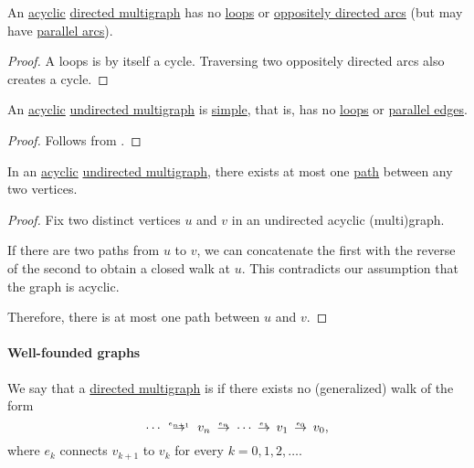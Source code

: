 \begin{proposition}\label{thm:acyclic_directed_multigraph}
  An \hyperref[def:acyclic_graph]{acyclic} \hyperref[def:directed_multigraph]{directed multigraph} has no \hyperref[def:directed_multigraph/loop]{loops} or \hyperref[def:directed_multigraph/parallel]{oppositely directed arcs} (but may have \hyperref[def:directed_multigraph/parallel]{parallel arcs}).
\end{proposition}
\begin{proof}
  A loops is by itself a cycle. Traversing two oppositely directed arcs also creates a cycle.
\end{proof}

\begin{proposition}\label{thm:acyclic_undirected_multigraph}
  An \hyperref[def:acyclic_graph]{acyclic} \hyperref[def:hypergraph/multigraph]{undirected multigraph} is \hyperref[def:undirected_graph]{simple}, that is, has no \hyperref[def:hypergraph/loop]{loops} or \hyperref[def:hypergraph/parallel]{parallel edges}.
\end{proposition}
\begin{proof}
  Follows from .
\end{proof}

\begin{proposition}\label{thm:acyclic_graph_paths}
  In an \hyperref[def:acyclic_graph]{acyclic} \hyperref[def:hypergraph/multigraph]{undirected multigraph}, there exists at most one \hyperref[def:graph_walk/path]{path} between any two vertices.
\end{proposition}
\begin{proof}
  Fix two distinct vertices \( u \) and \( v \) in an undirected acyclic (multi)graph.

  If there are two paths from \( u \) to \( v \), we can concatenate the first with the reverse of the second to obtain a closed walk at \( u \). This contradicts our assumption that the graph is acyclic.

  Therefore, there is at most one path between \( u \) and \( v \).
\end{proof}

\paragraph{Well-founded graphs}

\begin{definition}\label{def:well_founded_graph}\mimprovised
  We say that a \hyperref[def:directed_multigraph]{directed multigraph} is  if there exists no (generalized) walk of the form
  \begin{equation}
    \cdots \reloset {e_{n+1}} \to v_n \reloset {e_n} \to \cdots \reloset {e_1} \to v_1 \reloset {e_0} \to v_0,
  \end{equation}
  where \( e_k \) connects \( v_{k+1} \) to \( v_k \) for every \( k = 0, 1, 2, \ldots \).
\end{definition}

